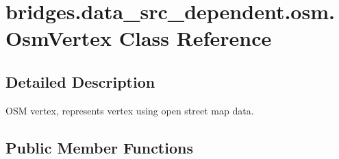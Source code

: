 \hypertarget{classbridges_1_1data__src__dependent_1_1osm_1_1_osm_vertex}{}\section{bridges.\+data\+\_\+src\+\_\+dependent.\+osm.\+Osm\+Vertex Class Reference}
\label{classbridges_1_1data__src__dependent_1_1osm_1_1_osm_vertex}


\subsection{Detailed Description}
O\+SM vertex, represents vertex using open street map data. \subsection*{Public Member Functions}
